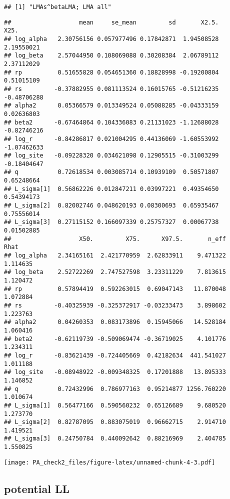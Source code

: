 \documentclass[12pt,]{article}
\begin{document}
\begin{verbatim}
## [1] "LMAs^betaLMA; LMA all"
\end{verbatim}

\begin{verbatim}
##                   mean     se_mean         sd       X2.5.        X25.
## log_alpha   2.30756156 0.057977496 0.17842871  1.94508528  2.19550021
## log_beta    2.57044950 0.108069088 0.30208384  2.06789112  2.37112029
## rp          0.51655828 0.054651360 0.18828998 -0.19200804  0.51015109
## rs         -0.37882955 0.081113524 0.16015765 -0.51216235 -0.48706288
## alpha2      0.05366579 0.013349524 0.05088285 -0.04333159  0.02636803
## beta2      -0.67464864 0.104336083 0.21131023 -1.12688028 -0.82746216
## log_r      -0.84286817 0.021004295 0.44136069 -1.60553992 -1.07462633
## log_site   -0.09228320 0.034621098 0.12905515 -0.31003299 -0.18404647
## q           0.72618534 0.003085714 0.10939109  0.50571807  0.65248664
## L_sigma[1]  0.56862226 0.012847211 0.03997221  0.49354650  0.54394173
## L_sigma[2]  0.82002746 0.048620193 0.08300693  0.65935467  0.75556014
## L_sigma[3]  0.27115152 0.166097339 0.25757327  0.00067738  0.01502885
##                   X50.         X75.      X97.5.       n_eff     Rhat
## log_alpha   2.34165161  2.421770959  2.62833911    9.471322 1.114635
## log_beta    2.52722269  2.747527598  3.23311229    7.813615 1.120472
## rp          0.57894419  0.592263015  0.69047143   11.870048 1.072884
## rs         -0.40325939 -0.325372917 -0.03233473    3.898602 1.223763
## alpha2      0.04260353  0.083173896  0.15945066   14.528184 1.060416
## beta2      -0.62119739 -0.509069474 -0.36719025    4.101776 1.234311
## log_r      -0.83621439 -0.724405669  0.42182634  441.541027 1.011188
## log_site   -0.08948922 -0.009348325  0.17201888   13.895333 1.146852
## q           0.72432996  0.786977163  0.95214877 1256.760220 1.010674
## L_sigma[1]  0.56477166  0.590560232  0.65126689    9.680520 1.273770
## L_sigma[2]  0.82787095  0.883075019  0.96662715    2.914710 1.419521
## L_sigma[3]  0.24750784  0.440092642  0.88216969    2.404785 1.550825
\end{verbatim}

\texttt{[image: PA\_check2\_files/figure-latex/unnamed-chunk-4-3.pdf]}

\newpage

\subsection{potential LL}\label{potential-ll}
\end{document}
